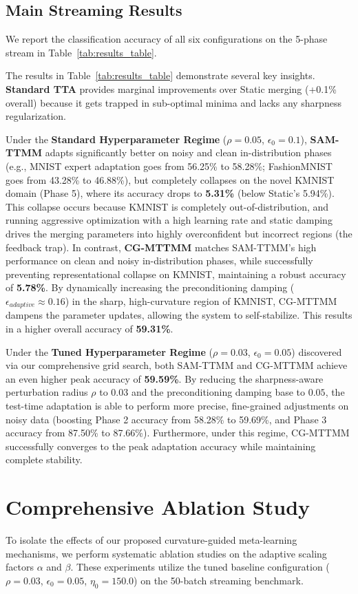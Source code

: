\documentclass{article}
\theoremstyle{plain}
\theoremstyle{definition}
\theoremstyle{remark}
\begin{document}
\subsection{Main Streaming Results}
We report the classification accuracy of all six configurations on the 5-phase stream in Table~\ref{tab:results_table}.

The results in Table~\ref{tab:results_table} demonstrate several key insights. \textbf{Standard TTA} provides marginal improvements over Static merging (+0.1\% overall) because it gets trapped in sub-optimal minima and lacks any sharpness regularization.

Under the \textbf{Standard Hyperparameter Regime} ($\rho=0.05$, $\epsilon_0=0.1$), \textbf{SAM-TTMM} adapts significantly better on noisy and clean in-distribution phases (e.g., MNIST expert adaptation goes from 56.25\% to 58.28\%; FashionMNIST goes from 43.28\% to 46.88\%), but completely collapses on the novel KMNIST domain (Phase 5), where its accuracy drops to \textbf{5.31\%} (below Static's 5.94\%). This collapse occurs because KMNIST is completely out-of-distribution, and running aggressive optimization with a high learning rate and static damping drives the merging parameters into highly overconfident but incorrect regions (the feedback trap).
In contrast, \textbf{CG-MTTMM} matches SAM-TTMM's high performance on clean and noisy in-distribution phases, while successfully preventing representational collapse on KMNIST, maintaining a robust accuracy of \textbf{5.78\%}. By dynamically increasing the preconditioning damping ($\epsilon_{adaptive} \approx 0.16$) in the sharp, high-curvature region of KMNIST, CG-MTTMM dampens the parameter updates, allowing the system to self-stabilize. This results in a higher overall accuracy of \textbf{59.31\%}.

Under the \textbf{Tuned Hyperparameter Regime} ($\rho=0.03$, $\epsilon_0=0.05$) discovered via our comprehensive grid search, both SAM-TTMM and CG-MTTMM achieve an even higher peak accuracy of \textbf{59.59\%}. By reducing the sharpness-aware perturbation radius $\rho$ to $0.03$ and the preconditioning damping base to $0.05$, the test-time adaptation is able to perform more precise, fine-grained adjustments on noisy data (boosting Phase 2 accuracy from 58.28\% to 59.69\%, and Phase 3 accuracy from 87.50\% to 87.66\%). Furthermore, under this regime, CG-MTTMM successfully converges to the peak adaptation accuracy while maintaining complete stability.

\section{Comprehensive Ablation Study}
\label{sec:ablation}
To isolate the effects of our proposed curvature-guided meta-learning mechanisms, we perform systematic ablation studies on the adaptive scaling factors $\alpha$ and $\beta$. These experiments utilize the tuned baseline configuration ($\rho=0.03$, $\epsilon_0=0.05$, $\eta_0=150.0$) on the 50-batch streaming benchmark.
\end{document}
